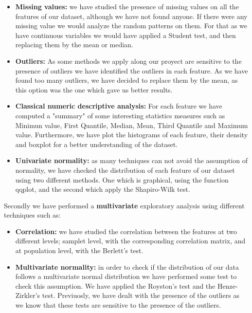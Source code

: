 \documentclass[10pt,a4paper]{article}
\theoremstyle{definition}
\theoremstyle{definition}
\begin{document}
\begin{itemize}
	\item \textbf{Missing values:} we have studied the presence of missing values on all the features of our dataset, although we have not found anyone.  If there were any missing value we would analyze the random patterns on them. For that as we have continuous variables we would have applied a Student test, and then replacing them by the mean or median.
	
	\item \textbf{Outliers:}  As some methods we apply along our proyect are sensitive to the presence of outliers we have identified the outliers in each feature. As we have found too many outliers, we have decided to replace them by the mean, as this option was the one which gave us better results. 
	
	
	\item \textbf{Classical numeric descriptive analysis:} For each feature we have computed a "summary" of some interesting statistics measures such as Minimun value, First Quantile, Median, Mean, Third Quantile and Maximum value. Furthermore, we have plot the histograms of each feature, their density and boxplot for a better understanding of the dataset.
	
	\item \textbf{Univariate normality:} as many techniques can not avoid the assumption of normality, we have checked the distribution of each feature of our dataset using two different methods. One which is graphical, using the function qqplot, and the second which apply the Shapiro-Wilk test.\\
	
\end{itemize}

Secondly we have performed a \textbf{multivariate} exploratory analysis using different techniques such as: 

\begin{itemize}
	\item \textbf{Correlation:} we have studied the correlation between the features at two different levels; samplet level, with the corresponding correlation matrix, and at population level, with the Berlett's test. 
	
	\item \textbf{Multivariate normality:} in order to check if the distribution of our data follows a multivariate normal distribution we have performed some test to check  this assumption. We have applied the Royston's test and the Henze-Zirkler's test. Previuosly, we have dealt with the presence of the outliers as we know that these tests are sensitive to the presence of the outliers.
	
\end{itemize}
\end{document}
